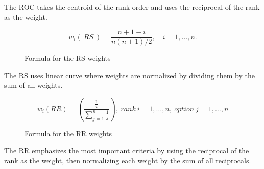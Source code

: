 The \ac{ROC} takes the centroid of the rank order and uses the reciprocal of the rank as the weight.

\begin{figure}[h]
    \centering
    \[ w_{i}(\ RS\ ) = \frac{n + 1 - i}{n(n + 1)/2}, \quad i = 1, \ldots, n. \]
    \caption{Formula for the \ac{RS} weights}
\end{figure}

The \ac{RS} uses linear curve where weights are normalized by dividing them by the sum of all weights.

\begin{figure}[h]
    \centering
    \[ w_i(RR) = \left( \frac{\frac{1}{i}}{\sum_{j=1}^{n} \frac{1}{j}} \right) , \ rank\ i = 1, \ldots, n, \ option\ j = 1, \ldots, n \]
    \caption{Formula for the \ac{RR} weights}
\end{figure}

The \ac{RR} emphasizes the most important criteria by using the reciprocal of the rank as the weight, then normalizing each weight by the sum of all reciprocals.